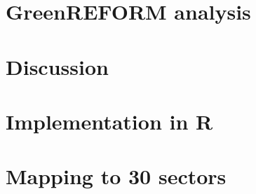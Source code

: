 \documentclass{article}
\begin{document}
\section{GreenREFORM analysis}\label{GRmodel}


\section{Discussion}\label{sec:discussion}


%




\newpage
\appendix

\section{Implementation in R}



\section{Mapping to 30 sectors}

\end{document}

